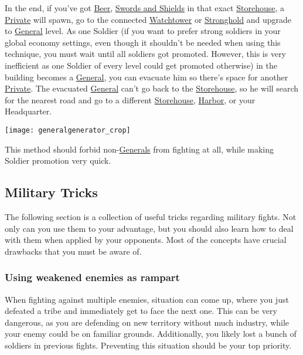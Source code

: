 \documentclass[12pt]{article}
\begin{document}
In the end, if you've got \hyperref[sec:brewery]{Beer}, \hyperref[sec:smithy]{Swords and Shields} in that exact \hyperref[sec:storehouse]{Storehouse}, a \hyperref[sec:private]{Private} will spawn, go to the connected \hyperref[sec:watchtower]{Watchtower} or \hyperref[sec:stronghold]{Stronghold} and upgrade to \hyperref[sec:general]{General} level. As one Soldier (if you want to prefer strong soldiers in your global economy settings, even though it shouldn't be needed when using this technique, you must wait until all soldiers got promoted. However, this is very inefficient as one Soldier of every level could get promoted otherwise) in the building becomes a \hyperref[sec:general]{General}, you can evacuate him so there's space for another \hyperref[sec:private]{Private}. The evacuated \hyperref[sec:general]{General} can't go back to the \hyperref[sec:storehouse]{Storehouse}, so he will search for the nearest road and go to a different \hyperref[sec:storehouse]{Storehouse}, \hyperref[sec:harbor]{Harbor}, or your Headquarter.

\vspace{0.5cm}
\texttt{[image: generalgenerator\_crop]}
\vspace{0.5cm}

This method should forbid non-\hyperref[sec:general]{Generals} from fighting at all, while making Soldier promotion very quick.

\subsection{Military Tricks}
\label{sec:militarytricks}

The following section is a collection of useful tricks regarding military fights. Not only can you use them to your advantage, but you should also learn how to deal with them when applied by your opponents. Most of the concepts have crucial drawbacks that you must be aware of.

\subsubsection{Using weakened enemies as rampart}
\label{sec:militaryrampart}

When fighting against multiple enemies, situation can come up, where you just defeated a tribe and immediately get to face the next one. This can be very dangerous, as you are defending on new territory without much industry, while your enemy could be on familiar grounds. Additionally, you likely lost a bunch of soldiers in previous fights. Preventing this situation should be your top priority.
\end{document}
